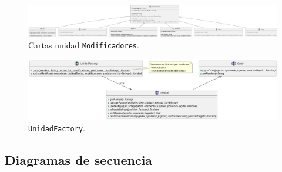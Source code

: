 \documentclass[titlepage,a4paper]{article}
\begin{document}
	\begin{figure}[H]
		\centering
		\includegraphics[width=1\textwidth]{diagramas/clases/Modificadores}
		\caption{\label{fig:class08}Cartas unidad \texttt{Modificadores}.}
	\end{figure}

	\begin{figure}[H]
		\centering
		\includegraphics[width=1\textwidth]{diagramas/clases/UnidadFactory}
		\caption{\label{fig:class09} \texttt{UnidadFactory}.}
	\end{figure}

	\subsection{Diagramas de secuencia}\label{sec:diagramasdesecuencia}

\end{document}
